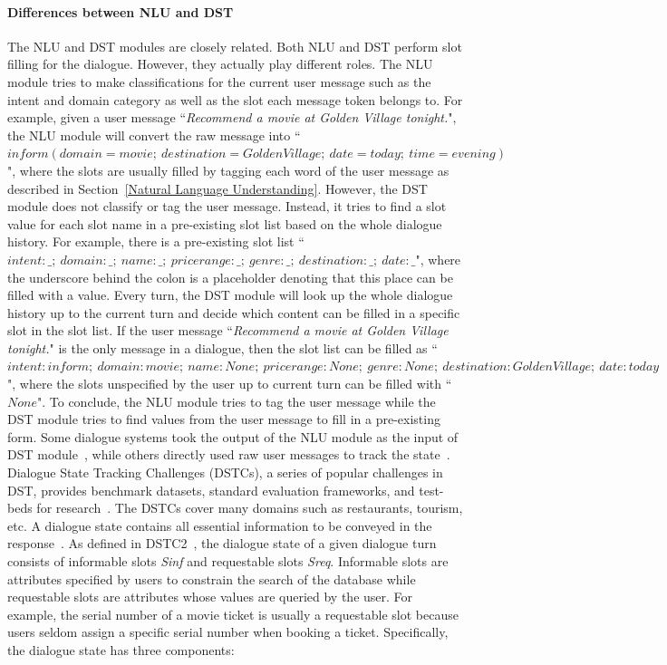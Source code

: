 \paragraph*{Differences between NLU and DST} The NLU and DST modules are closely related. Both NLU and DST perform slot filling for the dialogue. However, they actually play different roles. The NLU module tries to make classifications for the current user message such as the intent and domain category as well as the slot each message token belongs to. For example, given a user message ``\textit{Recommend a movie at Golden Village tonight.}", the NLU module will convert the raw message into ``$inform (domain = movie;\ destination = Golden Village;\ date = today;\ time = evening)$", where the slots are usually filled by tagging each word of the user message as described in Section~\ref{Natural Language Understanding}. However, the DST module does not classify or tag the user message. Instead, it tries to find a slot value for each slot name in a pre-existing slot list based on the whole dialogue history. For example, there is a pre-existing slot list ``$intent:\_;\ domain:\_;\ name:\_;\ pricerange:\_;\ genre:\_;\ destination:\_;\ date:\_$", where the underscore behind the colon is a placeholder denoting that this place can be filled with a value. Every turn, the DST module will look up the whole dialogue history up to the current turn and decide which content can be filled in a specific slot in the slot list. If the user message ``\textit{Recommend a movie at Golden Village tonight.}" is the only message in a dialogue, then the slot list can be filled as ``$intent: inform;\ domain: movie;\ name: None;\ pricerange: None;\ genre: None;\ destination: Golden Village;\ date: today$", where the slots unspecified by the user up to current turn can be filled with ``$None$". To conclude, the NLU module tries to tag the user message while the DST module tries to find values from the user message to fill in a pre-existing form. Some dialogue systems took the output of the NLU module as the input of DST module~, while others directly used raw user messages to track the state~. 
Dialogue State Tracking Challenges (DSTCs), a series of popular challenges in DST, provides benchmark datasets, standard evaluation frameworks, and test-beds for research~. The DSTCs cover many domains such as restaurants, tourism, etc. 
A dialogue state contains all essential information to be conveyed in the response~. As defined in DSTC2~, the dialogue state of a given dialogue turn consists of informable slots \textit{Sinf} and requestable slots \textit{Sreq}. Informable slots are attributes specified by users to constrain the search of the database while requestable slots are attributes whose values are queried by the user. For example, the serial number of a movie ticket is usually a requestable slot because users seldom assign a specific serial number when booking a ticket. Specifically, the dialogue state has three components:
